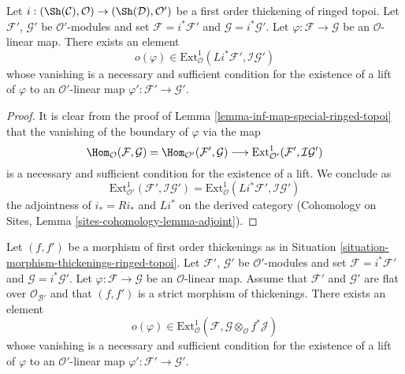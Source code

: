 \begin{lemma}
\label{lemma-inf-obs-map-special-ringed-topoi}
Let $i : (\Sh(\mathcal{C}), \mathcal{O}) \to (\Sh(\mathcal{D}), \mathcal{O}')$
be a first order thickening of ringed topoi.
Let $\mathcal{F}'$, $\mathcal{G}'$ be $\mathcal{O}'$-modules and set
$\mathcal{F} = i^*\mathcal{F}'$ and $\mathcal{G} = i^*\mathcal{G}'$.
Let $\varphi : \mathcal{F} \to \mathcal{G}$ be an $\mathcal{O}$-linear map.
There exists an element
$$
o(\varphi) \in
\text{Ext}^1_\mathcal{O}(Li^*\mathcal{F}', \mathcal{I}\mathcal{G}')
$$
whose vanishing is a necessary and sufficient condition for the
existence of a lift of $\varphi$ to an $\mathcal{O}'$-linear map
$\varphi' : \mathcal{F}' \to \mathcal{G}'$.
\end{lemma}

\begin{proof}
It is clear from the proof of Lemma \ref{lemma-inf-map-special-ringed-topoi}
that the vanishing of the boundary of $\varphi$ via the map
$$
\Hom_\mathcal{O}(\mathcal{F}, \mathcal{G}) =
\Hom_{\mathcal{O}'}(\mathcal{F}', \mathcal{G}) \longrightarrow
\text{Ext}^1_{\mathcal{O}'}(\mathcal{F}', \mathcal{I}\mathcal{G}')
$$
is a necessary and sufficient condition for the existence of a lift. We
conclude as
$$
\text{Ext}^1_{\mathcal{O}'}(\mathcal{F}', \mathcal{I}\mathcal{G}') =
\text{Ext}^1_\mathcal{O}(Li^*\mathcal{F}', \mathcal{I}\mathcal{G}')
$$
the adjointness of $i_* = Ri_*$ and $Li^*$ on the derived category
(Cohomology on Sites, Lemma \ref{sites-cohomology-lemma-adjoint}).
\end{proof}

\begin{lemma}
\label{lemma-inf-obs-map-rel-ringed-topoi}
Let $(f, f')$ be a morphism of first order thickenings as in
Situation \ref{situation-morphism-thickenings-ringed-topoi}.
Let $\mathcal{F}'$, $\mathcal{G}'$ be $\mathcal{O}'$-modules and set
$\mathcal{F} = i^*\mathcal{F}'$ and $\mathcal{G} = i^*\mathcal{G}'$.
Let $\varphi : \mathcal{F} \to \mathcal{G}$ be an $\mathcal{O}$-linear map.
Assume that $\mathcal{F}'$ and $\mathcal{G}'$ are flat over
$\mathcal{O}_{\mathcal{B}'}$ and
that $(f, f')$ is a strict morphism of thickenings. There exists an element
$$
o(\varphi) \in
\text{Ext}^1_\mathcal{O}(\mathcal{F},
\mathcal{G} \otimes_\mathcal{O} f^*\mathcal{J})
$$
whose vanishing is a necessary and sufficient condition for the
existence of a lift of $\varphi$ to an $\mathcal{O}'$-linear map
$\varphi' : \mathcal{F}' \to \mathcal{G}'$.
\end{lemma}

